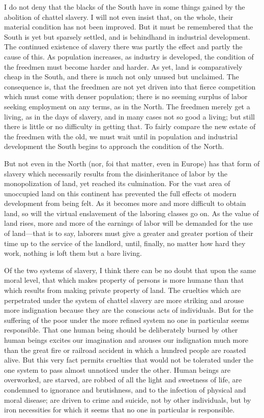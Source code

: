 \documentclass{book}
\begin{document}
I do not deny that the blacks of the South have in some things gained by the abolition of chattel slavery. I will not even insist that, on the whole, their material condition has not been improved. But it must be remembered that the South is yet but sparsely settled, and is behindhand in industrial development. The continued existence of slavery there was partly the effect and partly the cause of this. As population increases, as industry is developed, the condition of the freedmen must become harder and harder. As yet, land is comparatively cheap in the South, and there is much not only unused but unclaimed. The consequence is, that the freedmen are not yet driven into that fierce competition which must come with denser population; there is no seeming surplus of labor seeking employment on any terms, as in the North. The freedmen merely get a living, as in the days of slavery, and in many cases not so good a living; but still there is little or no difficulty in getting that. To fairly compare the new estate of the freedmen with the old, we must wait until in population and industrial development the South begins to approach the condition of the North.

But not even in the North (nor, foi that matter, even in Europe) has that form of slavery which necessarily results from the disinheritance of labor by the monopolization of land, yet reached its culmination. For the vast area of unoccupied land on this continent has prevented the full effects ot modern development from being felt. As it becomes more and more difficult to obtain land, so will the virtual enslavement of the laboring classes go on. As the value of land rises, more and more of the earnings of labor will be demanded for the use of land—that is to say, laborers must give a greater and greater portion of their time up to the service of the landlord, until, finally, no matter how hard they work, nothing is loft them but a bare living.

Of the two systems of slavery, I think there can be no doubt that upon the same moral level, that which makes property of persons is more humane than that which results from making private property of land. The cruelties which are perpetrated under the system of chattel slavery are more striking and arouse more indignation because they are the conscious acts of individuals. But for the suffering of the poor under the more refined system no one in particular seems responsible. That one human being should be deliberately burned by other human beings excites our imagination and arouses our indignation much more than the great fire or railroad accident in which a hundred people are roasted alive. But this very fact permits cruelties that would not be tolerated under the one system to pass almost unnoticed under the other. Human beings are overworked, are starved, are robbed of all the light and sweetness of life, are condemned to ignorance and brutishness, and to the infection of physical and moral disease; are driven to crime and suicide, not by other individuals, but by iron necessities for which it seems that no one in particular is responsible.
\end{document}

